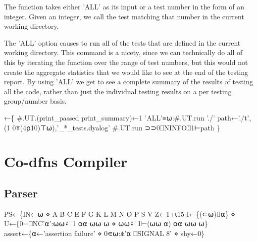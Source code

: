 \documentclass{article}%
\begin{document}
The {\Tt{}\nwendquote} function takes either {\Tt{}'ALL'\nwendquote} as its input or a test
number in the form of an integer.
Given an integer, we call the test matching that number in the
current working directory.

The {\Tt{}'ALL'\nwendquote} option causes {\Tt{}\nwendquote} to run all of the tests that are
defined in the current working directory.
This command is a nicety, since we can technically do all of this
by iterating the {\Tt{}\nwendquote} function over the range of test numbers,
but this would not create the aggregate statistics that we would
like to see at the end of the testing report.
By using {\Tt{}'ALL'\nwendquote} we get to see a complete summary of the
results of testing all the code,
rather than just the individual testing results on a per testing
group/number basis.

\nwenddocs{}\endmoddef\nwstartdeflinemarkup\nwenddeflinemarkup
{}←\{
        #.UT.(print_passed print_summary)←1
        'ALL'≡⍵:#.UT.run './'
        path←'./t',(1 0⍕(4⍴10)⊤⍵),'_*_tests.dyalog'
        #.UT.run ⊃⊃0⎕NINFO⍠1⊢path
\}
\eatline
{}\nwendcode{}\nwdocspar
\section{Co-dfns Compiler}

\subsection{Parser}

\nwenddocs{}\endmoddef\nwstartdeflinemarkup{}\nwenddeflinemarkup
 PS←\{IN←⍵ ⋄ A B C E F G K L M N O P S V Z←1+⍳15
         I←\{(⊂⍵)⌷⍺\} ⋄ U←\{0=⎕NC'⍺':⍵⍵⍣¯1 ⍺⍺ ⍵⍵ ⍵ ⋄ ⍵⍵⍣¯1⊢(⍵⍵ ⍺) ⍺⍺ ⍵⍵ ⍵\}
         assert←\{⍺←'assertion failure' ⋄ 0∊⍵:⍎'⍺ ⎕SIGNAL 8' ⋄ shy←0\}
\end{document}

